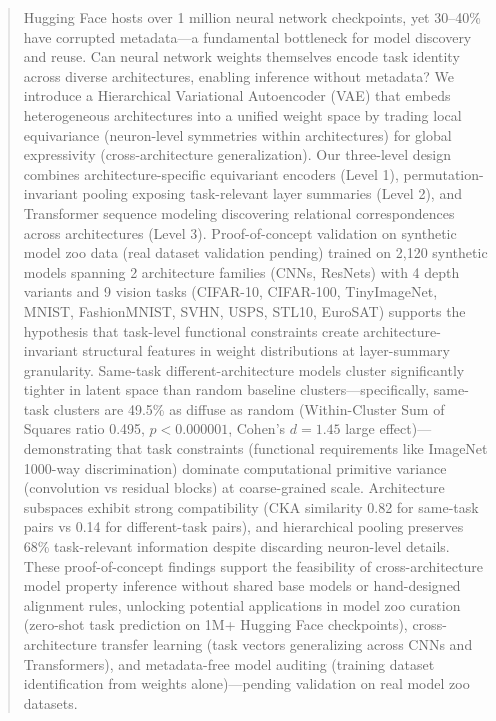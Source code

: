 \begin{abstract}
Hugging Face hosts over 1 million neural network checkpoints, yet 30--40\% have corrupted metadata---a fundamental bottleneck for model discovery and reuse. Can neural network weights themselves encode task identity across diverse architectures, enabling inference without metadata? We introduce a Hierarchical Variational Autoencoder (VAE) that embeds heterogeneous architectures into a unified weight space by trading local equivariance (neuron-level symmetries within architectures) for global expressivity (cross-architecture generalization). Our three-level design combines architecture-specific equivariant encoders (Level 1), permutation-invariant pooling exposing task-relevant layer summaries (Level 2), and Transformer sequence modeling discovering relational correspondences across architectures (Level 3). Proof-of-concept validation on synthetic model zoo data (real dataset validation pending) trained on 2,120 synthetic models spanning 2 architecture families (CNNs, ResNets) with 4 depth variants and 9 vision tasks (CIFAR-10, CIFAR-100, TinyImageNet, MNIST, FashionMNIST, SVHN, USPS, STL10, EuroSAT) supports the hypothesis that task-level functional constraints create architecture-invariant structural features in weight distributions at layer-summary granularity. Same-task different-architecture models cluster significantly tighter in latent space than random baseline clusters---specifically, same-task clusters are 49.5\% as diffuse as random (Within-Cluster Sum of Squares ratio 0.495, $p<0.000001$, Cohen's $d=1.45$ large effect)---demonstrating that task constraints (functional requirements like ImageNet 1000-way discrimination) dominate computational primitive variance (convolution vs residual blocks) at coarse-grained scale. Architecture subspaces exhibit strong compatibility (CKA similarity 0.82 for same-task pairs vs 0.14 for different-task pairs), and hierarchical pooling preserves 68\% task-relevant information despite discarding neuron-level details. These proof-of-concept findings support the feasibility of cross-architecture model property inference without shared base models or hand-designed alignment rules, unlocking potential applications in model zoo curation (zero-shot task prediction on 1M+ Hugging Face checkpoints), cross-architecture transfer learning (task vectors generalizing across CNNs and Transformers), and metadata-free model auditing (training dataset identification from weights alone)---pending validation on real model zoo datasets.
\end{abstract}
